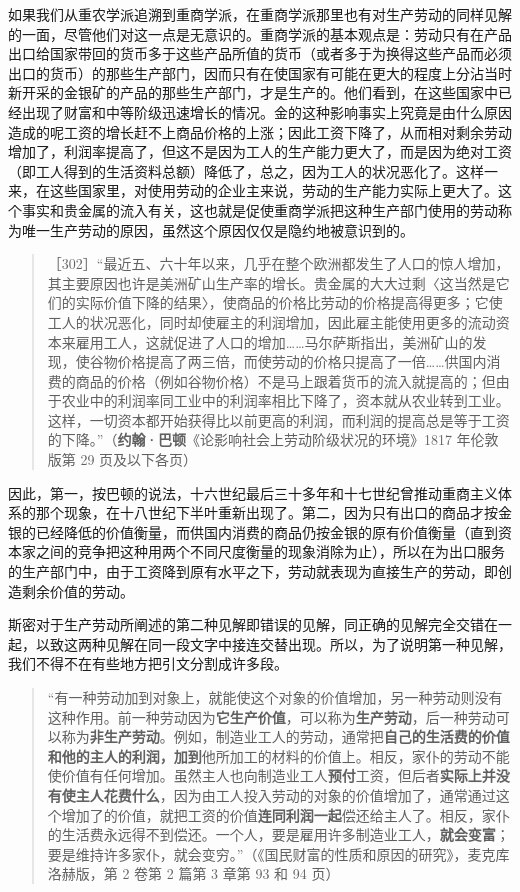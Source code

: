 如果我们从重农学派追溯到重商学派，在重商学派那里也有对生产劳动的同样见解的一面，尽管他们对这一点是无意识的。重商学派的基本观点是：劳动只有在产品出口给国家带回的货币多于这些产品所值的货币（或者多于为换得这些产品而必须出口的货币）的那些生产部门，因而只有在使国家有可能在更大的程度上分沾当时新开采的金银矿的产品的那些生产部门，才是生产的。他们看到，在这些国家中已经出现了财富和中等阶级迅速增长的情况。金的这种影响事实上究竟是由什么原因造成的呢工资的增长赶不上商品价格的上涨；因此工资下降了，从而相对剩余劳动增加了，利润率提高了，但这不是因为工人的生产能力更大了，而是因为绝对工资（即工人得到的生活资料总额）降低了，总之，因为工人的状况恶化了。这样一来，在这些国家里，对使用劳动的企业主来说，劳动的生产能力实际上更大了。这个事实和贵金属的流入有关，这也就是促使重商学派把这种生产部门使用的劳动称为唯一生产劳动的原因，虽然这个原因仅仅是隐约地被意识到的。

\begin{quote}［302］“最近五、六十年以来，几乎在整个欧洲都发生了人口的惊人增加，其主要原因也许是美洲矿山生产率的增长。贵金属的大大过剩〈这当然是它们的实际价值下降的结果〉，使商品的价格比劳动的价格提高得更多；它使工人的状况恶化，同时却使雇主的利润增加，因此雇主能使用更多的流动资本来雇用工人，这就促进了人口的增加……马尔萨斯指出，美洲矿山的发现，使谷物价格提高了两三倍，而使劳动的价格只提高了一倍……供国内消费的商品的价格（例如谷物价格）不是马上跟着货币的流入就提高的；但由于农业中的利润率同工业中的利润率相比下降了，资本就从农业转到工业。这样，一切资本都开始获得比以前更高的利润，而利润的提高总是等于工资的下降。”（\textbf{约翰·巴顿}《论影响社会上劳动阶级状况的环境》1817 年伦敦版第 29 页及以下各页）\end{quote}

因此，第一，按巴顿的说法，十六世纪最后三十多年和十七世纪曾推动重商主义体系的那个现象，在十八世纪下半叶重新出现了。第二，因为只有出口的商品才按金银的已经降低的价值衡量，而供国内消费的商品仍按金银的原有价值衡量（直到资本家之间的竞争把这种用两个不同尺度衡量的现象消除为止），所以在为出口服务的生产部门中，由于工资降到原有水平之下，劳动就表现为直接生产的劳动，即创造剩余价值的劳动。


斯密对于生产劳动所阐述的第二种见解即错误的见解，同正确的见解完全交错在一起，以致这两种见解在同一段文字中接连交替出现。所以，为了说明第一种见解，我们不得不在有些地方把引文分割成许多段。

\begin{quote}“有一种劳动加到对象上，就能使这个对象的价值增加，另一种劳动则没有这种作用。前一种劳动因为\textbf{它生产价值}，可以称为\textbf{生产劳动}，后一种劳动可以称为\textbf{非生产劳动}。例如，制造业工人的劳动，通常把\textbf{自己的生活费的价值和他的主人的利润，加到}他所加工的材料的价值上。相反，家仆的劳动不能使价值有任何增加。虽然主人也向制造业工人\textbf{预付}工资，但后者\textbf{实际上并没有使主人花费什么}，因为由工人投入劳动的对象的价值增加了，通常通过这个增加了的价值，就把工资的价值\textbf{连同利润一起}偿还给主人了。相反，家仆的生活费永远得不到偿还。一个人，要是雇用许多制造业工人，\textbf{就会变富}；要是维持许多家仆，就会变穷。”（《国民财富的性质和原因的研究》，麦克库洛赫版，第 2 卷第 2 篇第 3 章第 93 和 94 页）\end{quote}

